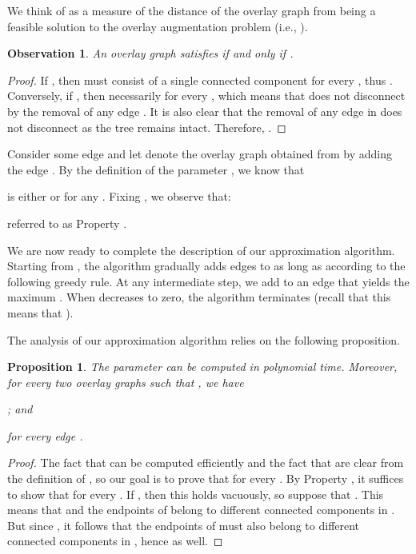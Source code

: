 \LongVersion \documentclass[11pt]{article}
\newtheorem{proposition}[theorem]{Proposition}
\newtheorem*{observation*}{Observation}
\theoremstyle{definition}
\theoremstyle{plain}
\newcounter{smallitemizec}
\newenvironment{smallitemize}
{   \setcounter{smallitemizec}{0}
    \vspace{-0.5ex}
  \begin{list}{}
    {\usecounter{smallitemizec}
      \setlength{\parsep}{0pt}
      \setlength{\itemsep}{0pt}}
    }{ \end{list}
   \vspace{-0.5ex}
}
\begin{document}
We think of  as a measure of the distance of the overlay graph
 from being a feasible solution to the overlay augmentation problem (i.e.,
).

\begin{observation*}
An overlay graph  satisfies  if and only if
.
\end{observation*}
\begin{proof}
If , then  must consist of a single connected
component for every , thus .
Conversely, if , then necessarily  for every , which means that  does not disconnect by the removal of
any edge .
It is also clear that the removal of any edge in  does
not disconnect  as the tree  remains intact.
Therefore, .
\end{proof}

Consider some edge  and let  denote the overlay graph obtained from  by adding the edge .
By the definition of the parameter , we know that

is either  or  for any .
Fixing
,
we observe that:

referred to as Property .

We are now ready to complete the description of our approximation algorithm.
Starting from , the algorithm gradually adds edges to  as long as
 according to the following greedy rule.
At any intermediate step, we add to  an edge  that yields the maximum .
When  decreases to zero, the algorithm terminates (recall that this
means that ).

The analysis of our approximation algorithm relies on the following
proposition.

\begin{proposition} \label{proposition:Submodularity}
The parameter  can be computed in polynomial time.
Moreover, for every two overlay graphs  such that , we have
\begin{smallitemize}
\item[\rm (1)]
; and
\item[\rm (2)]
 for every edge .
\end{smallitemize}
\end{proposition}
\begin{proof}
The fact that  can be computed efficiently and the fact that
 are clear from the definition of , so
our goal is to prove that  for every .
By Property , it suffices to show that
 for every .
If , then this holds vacuously, so suppose that
.
This means that  and the endpoints of  belong to
different connected components in .
But since , it follows that the endpoints
of  must also belong to different connected components in ,
hence  as well.
\end{proof}
\end{document}
